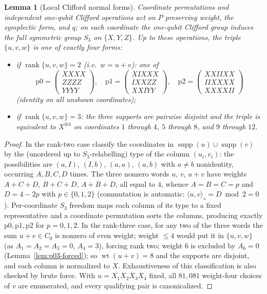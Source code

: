 \documentclass[11pt]{amsart}
\newtheorem{lemma}[theorem]{Lemma}
\theoremstyle{definition}
\theoremstyle{remark}
\DeclareMathOperator{\wt}{wt}
\DeclareMathOperator{\rk}{rank}
\DeclareMathOperator{\supp}{supp}
\newcommand{\sform}[2]{\langle #1,#2\rangle_s}
\begin{document}
\begin{lemma}[Local Clifford normal forms]\label{lem:lc}
Coordinate permutations and independent one-qubit Clifford operations act
on $P$ preserving weight, the symplectic form, and $q$; on each coordinate
the one-qubit Clifford group induces the full symmetric group $S_3$ on
$\{X,Y,Z\}$.  Up to these operations, the triple $\{u,v,w\}$ is one of
exactly four forms:
\begin{itemize}
\item if $\rk\{u,v,w\}=2$ (i.e.\ $w=u+v$): one of
\[
\mathrm{p0}=\begin{pmatrix}XXXX\\ZZZZ\\YYYY\end{pmatrix},\quad
\mathrm{p1}=\begin{pmatrix}XIXXX\\IXXZZ\\XXIYY\end{pmatrix},\quad
\mathrm{p2}=\begin{pmatrix}XXIIXX\\IIXXXX\\XXXXII\end{pmatrix}
\]
(identity on all unshown coordinates);
\item if $\rk\{u,v,w\}=3$: the three supports are pairwise disjoint and
the triple is equivalent to $X^{\otimes4}$ on coordinates $1$ through $4$,
$5$ through $8$, and $9$ through $12$.
\end{itemize}
\end{lemma}

\begin{proof}
In the rank-two case classify the coordinates in
$\supp(u)\cup\supp(v)$ by the (unordered up to $S_3$-relabelling) type of
the column $(u_i,v_i)$: the possibilities are $(a,I)$, $(I,b)$, $(a,a)$,
$(a,b)$ with $a\ne b$ nonidentity, occurring $A,B,C,D$ times.  The three
nonzero words $u$, $v$, $u+v$ have weights $A+C+D$, $B+C+D$, $A+B+D$, all
equal to $4$, whence $A=B=C=p$ and $D=4-2p$ with $p\in\{0,1,2\}$
(commutation is automatic: $\sform{u}{v}=D\bmod2=0$).  Per-coordinate
$S_3$ freedom maps each column of its type to a fixed representative and
a coordinate permutation sorts the columns, producing exactly
$\mathrm{p0},\mathrm{p1},\mathrm{p2}$ for $p=0,1,2$.  In the rank-three
case, for any two of the three words the sum $u+v\in C_0$ is nonzero of
even weight; weight $\le4$ would put it in $\{u,v,w\}$ (as
$A_1=A_2=A_3=0$, $A_4=3$), forcing rank two; weight $6$ is excluded by
$A_6=0$ (Lemma~\ref{lem:p03-forced}); so $\wt(u+v)=8$ and the supports
are disjoint, and each column is normalized to $X$.  Exhaustiveness of
this classification is also checked by brute force.  With
$u=X_1X_2X_3X_4$ fixed, all $81{,}081$ weight-four choices of $v$ are
enumerated, and every qualifying pair is canonicalized.
\end{proof}
\end{document}
